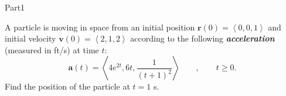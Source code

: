 \documentclass{report}
\newcommand{\avec}[1]{\left\langle #1 \right\rangle}
\begin{document}
\begin{exam}{Part1}
\begin{problem*}[\auto]
\begin{parts}
	\end{parts}
\end{problem*}

\begin{problem}[12] A particle is moving in space from an initial position $\mathbf{r}(0)=\avec{0,0,1}$ and initial velocity $\mathbf{v}(0)=\avec{2,1,2}$ according to the following  \textbf{\emph{acceleration}} (measured in ft/s) at time $t$:
	$$\mathbf{a}(t)=\avec{4e^{2t},6t,\dfrac{1}{(t+1)^2}} \qquad,\qquad t \ge 0. $$
	Find the position of the particle at $t=1$ s.
	

\end{problem}
\end{exam}
\end{document}
